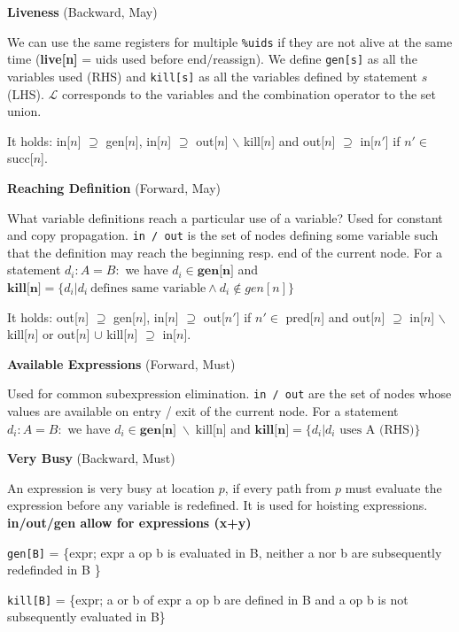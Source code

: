 \textbf{Liveness} (Backward, May)\medskip

We can use the same registers for multiple \texttt{\%uids} if they are not alive at the same time
(\textbf{live[n]} = uids used before end/reassign).
We define \texttt{gen[s]} as all the variables used (RHS) and \texttt{kill[s]} as all the variables defined by statement $s$ (LHS). $\mathcal L$ corresponds to the variables and the combination operator to the set union.\medskip

It holds: in[$n$] $\supseteq$ gen[$n$], in[$n$] $\supseteq$ out[$n$] $\backslash$ kill[$n$] and out[$n$] $\supseteq$ in[$n'$] if $n' \in $ succ[$n$].\medskip

\textbf{Reaching Definition} (Forward, May)\medskip

What variable definitions reach a particular use of a variable? Used for constant and copy propagation.
\texttt{in / out} is the set of nodes defining some variable such that the definition may reach the beginning resp.
end of the current node. For a statement $d_i: A=B:$ we have $d_i \in \textbf{gen[n]}$ and $\textbf{kill[n]}=\{d_i | d_i \ \text{defines same variable} \land d_i \notin gen[n]\} $\medskip

It holds: out[$n$] $\supseteq$ gen[$n$], in[$n$] $\supseteq$ out[$n'$] if $n' \in$ pred[$n$] and out[$n$] $\supseteq$ in[$n$] $\backslash$ kill[$n$] or out[$n$] $\cup$ kill[$n$] $\supseteq$ in[$n$].\medskip

\textbf{Available Expressions} (Forward, Must)\medskip

Used for common subexpression elimination.
\texttt{in / out} are the set of nodes whose values are available on entry / exit of the current node.
For a statement $d_i: A=B:$ we have $d_i \in \textbf{gen[n]} \;\backslash\; \text{kill[n]}$ and $\textbf{kill[n]}=\{d_i | \text{$d_i$ uses A (RHS)}\}$\medskip

\textbf{Very Busy} (Backward, Must)\medskip

An expression is very busy at location $p$, if every path from $p$ must evaluate the expression before any variable is redefined.
It is used for hoisting expressions. \textbf{in/out/gen allow for expressions (x+y)} \medskip

\texttt{gen[B]} = \{expr; expr a op b is evaluated in B, neither a nor b are subsequently redefinded in B \}\smallskip

\texttt{kill[B]} = \{expr; a or b of expr a op b are defined in B and a op b is not subsequently evaluated in B\} \medskip

